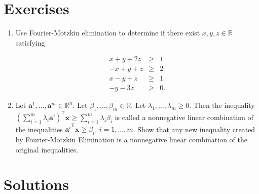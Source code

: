 \section*{Exercises}\label{exercises-3}

\begin{enumerate}
\def\labelenumi{\arabic{enumi}.}
\tightlist
\item
  Use Fourier-Motzkin elimination to determine if there exist
  \(x,y,z\in\mathbb{R}\) satisfying

  \begin{eqnarray*}
  x + y + 2z& \geq & 1 \\
  -x + y + z & \geq & 2 \\
  x-y + z  & \geq & 1 \\
  -y - 3z & \geq & 0.
  \end{eqnarray*}
\item
  Let \(\mathbf{a}^1,\ldots, \mathbf{a}^m \in \mathbb{R}^n\). Let
  \(\beta_1,\ldots, \beta_m \in\mathbb{R}\). Let
  \(\lambda_1,\ldots, \lambda_m \geq 0\). Then the inequality
  \(\displaystyle \left(\sum_{i = 1}^{m} \lambda_i {\mathbf{a}^{i}}\right)^\mathsf{T}\mathbf{x} \geq \sum_{i=1}^{m} \lambda_i \beta_i\)
  is called a nonnegative linear combination of the inequalities
  \({\mathbf{a}^{i}}^\mathsf{T} \mathbf{x} \geq \beta_i\),
  \(i = 1,\ldots, m\). Show that any new inequality created by
  Fourier-Motzkin Elimination is a nonnegative linear combination of the
  original inequalities.
\end{enumerate}

\section*{Solutions}\label{solutions-3}

